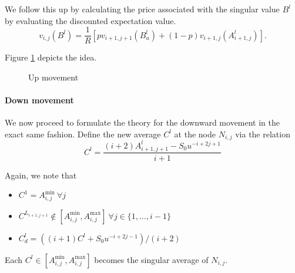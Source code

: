 We follow this up by calculating the price associated with the singular value $ B^l $ by evaluating the discounted expectation value.
\begin{equation}
	\label{eq:asian-up-pr}
	v_{i,j}( B^l ) = \frac{1}{R} \left[ p v_{i+1,j+1} \left( B^l_u \right) + (1 - p) v_{i+1,j} \left( A_{i+1,j}^l \right) \right] .
\end{equation}

Figure \ref{fig:asian-2tr-up} depicts the idea.
\begin{figure}[h]
	
	\caption{Up movement}
	\label{fig:asian-2tr-up}
\end{figure}



\paragraph{Down movement}

We now proceed to formulate the theory for the downward movement in the exact same fashion. Define the new average $ C^l $ at the node $ N_{i,j} $ via the relation
\begin{equation}
	\label{eq:asian-proj-dn}
	C^l = \frac{ ( i+2) A_{i+1,j+1}^l - S_0 u^{-i+2j+1} }{ i+1 }
\end{equation}

Again, we note that
\begin{itemize}
\item $ C^1 = A_{i,j}^{\min} \ \forall j $
\item $ C^{L_{i+1,j+1}} \notin \left[ A_{i,j}^{\min}, A_{i,j}^{\max} \right] \ \forall j \in \{1, \dots, i-1 \} $
\item $ C^l_d = \left( (i+1) C^l + S_0 u^{-i+2j-1} \right) / ( i+2 ) $
\end{itemize}
Each $ C^l \in \left[ A_{i,j}^{\min}, A_{i,j}^{\max} \right] $ becomes the singular average of $ N_{i,j} $.

